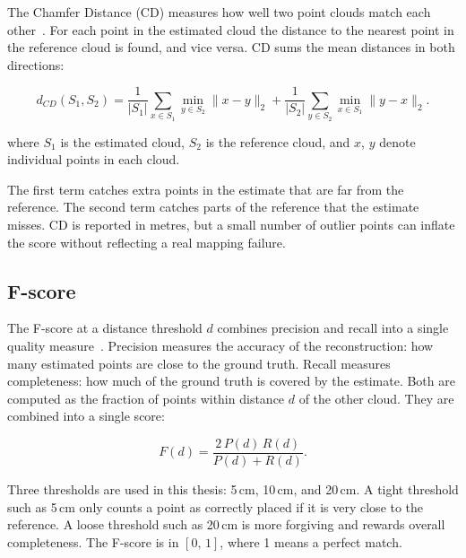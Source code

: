 The Chamfer Distance (CD) measures how well two point clouds match each
other~\cite{wu2021chamfer}.
For each point in the estimated cloud the distance to the nearest point in
the reference cloud is found, and vice versa.
CD sums the mean distances in both directions:

\begin{equation}
  d_{CD}(S_1, S_2) =
    \frac{1}{|S_1|}\sum_{x\in S_1}\min_{y\in S_2}\lVert x-y\rVert_2
    +
    \frac{1}{|S_2|}\sum_{y\in S_2}\min_{x\in S_1}\lVert y-x\rVert_2.
  \label{eq:chamfer}
\end{equation}

\noindent where $S_1$ is the estimated cloud, $S_2$ is the reference cloud,
and $x$, $y$ denote individual points in each cloud.

The first term catches extra points in the estimate that are far from the
reference. The second term catches parts of the reference that the estimate
misses.
CD is reported in metres, but a small number of outlier points can inflate
the score without reflecting a real mapping failure.

\subsection{F-score}

The F-score at a distance threshold $d$ combines precision and recall into a
single quality measure~\cite{knapitsch2017tanks}.
Precision measures the accuracy of the reconstruction: how many estimated
points are close to the ground truth.
Recall measures completeness: how much of the ground truth is covered by
the estimate.
Both are computed as the fraction of points within distance $d$ of the
other cloud.
They are combined into a single score:

\begin{equation}
  F(d) = \frac{2\,P(d)\,R(d)}{P(d)+R(d)}.
  \label{eq:fscore}
\end{equation}

Three thresholds are used in this thesis: 5\,cm, 10\,cm, and 20\,cm.
A tight threshold such as 5\,cm only counts a point as correctly placed if
it is very close to the reference.
A loose threshold such as 20\,cm is more forgiving and rewards overall
completeness.
The F-score is in $[0,\,1]$, where 1 means a perfect match.
